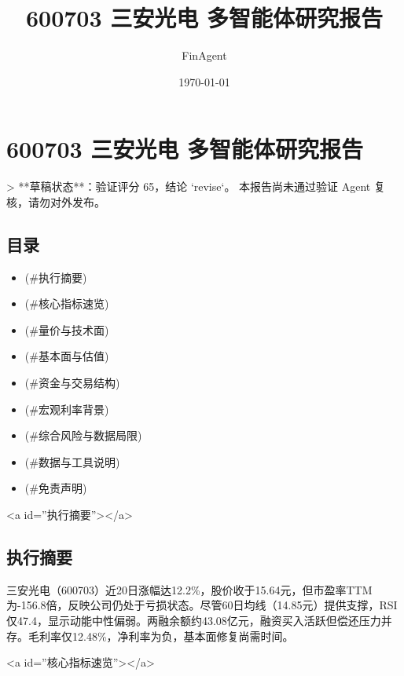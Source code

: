 \documentclass[12pt,a4paper]{article}
\title{600703 三安光电 多智能体研究报告}
\author{FinAgent}
\date{\today}
\begin{document}
\maketitle
\tableofcontents
\newpage
\sloppy
\section{600703 三安光电 多智能体研究报告}

> **草稿状态**：验证评分 65，结论 `revise`。 本报告尚未通过验证 Agent 复核，请勿对外发布。

\subsection{ 目录}

\begin{itemize}
\item [执行摘要](\#执行摘要)
\item [核心指标速览](\#核心指标速览)
\item [量价与技术面](\#量价与技术面)
\item [基本面与估值](\#基本面与估值)
\item [资金与交易结构](\#资金与交易结构)
\item [宏观利率背景](\#宏观利率背景)
\item [综合风险与数据局限](\#综合风险与数据局限)
\item [数据与工具说明](\#数据与工具说明)
\item [免责声明](\#免责声明)
\end{itemize}

<a id=''执行摘要''></a>

\subsection{ 执行摘要}
三安光电（600703）近20日涨幅达12.2\%，股价收于15.64元，但市盈率TTM为-156.8倍，反映公司仍处于亏损状态。尽管60日均线（14.85元）提供支撑，RSI仅47.4，显示动能中性偏弱。两融余额约43.08亿元，融资买入活跃但偿还压力并存。毛利率仅12.48\%，净利率为负，基本面修复尚需时间。

<a id=''核心指标速览''></a>
\end{document}
